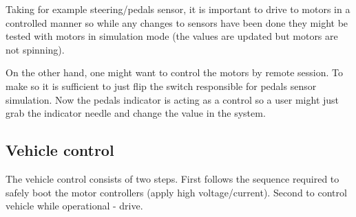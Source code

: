 Taking for example steering/pedals sensor, it is important to drive to motors in a controlled manner so while any changes to sensors have been done they might be tested with motors in simulation mode (the values are updated but motors are not spinning).

On the other hand, one might want to control the motors by remote session. To make so it is sufficient to just flip the switch responsible for pedals sensor simulation. Now the pedals indicator is acting as a control so a user might just grab the indicator needle and change the value in the system.

\subsection{Vehicle control}\label{sec:veh_contr}
The vehicle control consists of two steps. First follows the sequence required to safely boot the motor controllers (apply high voltage/current). Second to control vehicle while operational - drive.

